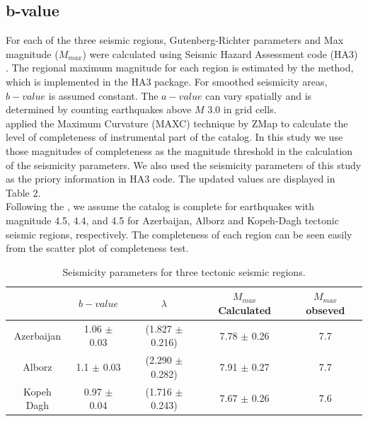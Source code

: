 \subsection{b-value}

For each of the three seismic regions, Gutenberg-Richter parameters and Max magnitude ($M_{max}$) were calculated using Seismic Hazard Assessment code (HA3) \citep{kijko2004}. The regional maximum magnitude for each region is estimated by the \citet{Kijko1989} method, which is implemented in the HA3 package. For smoothed seismicity areas, $b-value$ is assumed constant. The $a-value$ can vary spatially and is determined by counting earthquakes above $M$ 3.0 in grid cells.\\
\noindent
\citet{Karimiparidari2013} applied the Maximum Curvature (MAXC) technique \citep{Wyss1999, Wiemer2000} by ZMap \citep{Wiemer2001} to calculate the level of completeness of instrumental part of the catalog. In this study we use those magnitudes of completeness as the magnitude threshold in the calculation of the seismicity parameters. We also used the seismicity parameters of this study \citep{Karimiparidari2013} as the priory information in HA3 code. The updated values are displayed in Table 2. \\
\noindent
Following the \citet{Karimiparidari2013}, we assume the catalog is complete for earthquakes with magnitude 4.5, 4.4, and 4.5 for Azerbaijan, Alborz and Kopeh-Dagh tectonic seismic regions, respectively. The completeness of each region can be seen easily from the scatter plot of completeness test. 

\begin{table}[!ht]
\centering
\caption{Seismicity parameters for three tectonic seismic regions.}
    \begin{tabular}{ccccc}
    ~                   & $b-value$            & $\lambda$                  & $M_{max}$ Calculated & $M_{max}$ obseved \\ \hline
    Azerbaijan    & 1.06 $\pm$ 0.03  & (1.827  $\pm$ 0.216) & 7.78  $\pm$ 0.26           & 7.7          \\ \hline
    Alborz           & 1.1  $\pm$ 0.03   & (2.290  $\pm$ 0.282) & 7.91  $\pm$ 0.27           & 7.7          \\ \hline
    Kopeh Dagh & 0.97  $\pm$ 0.04 & (1.716  $\pm$ 0.243) & 7.67  $\pm$ 0.26           & 7.6          \\
    \end{tabular}
  
\end{table}


